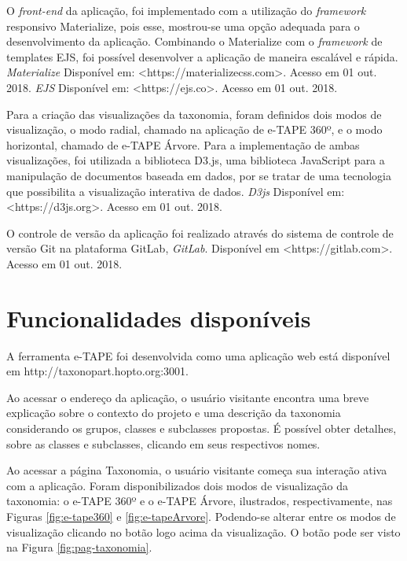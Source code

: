 \par
O \textit{front-end} da aplicação, foi implementado com a utilização do \textit{framework} responsivo Materialize, pois esse, 
mostrou-se uma opção adequada para o desenvolvimento da aplicação. Combinando o Materialize com o \textit{framework} de templates EJS, 
foi possível desenvolver a aplicação de maneira escalável e rápida. \textit{Materialize} Disponível em: <https://materializecss.com>. Acesso em 01 out. 2018.
\textit{EJS} Disponível em: <https://ejs.co>. Acesso em 01 out. 2018.

\par
Para a criação das visualizações da taxonomia, foram definidos dois modos de visualização, o modo radial, chamado na aplicação de e-TAPE 360º, e o modo horizontal, 
chamado de e-TAPE Árvore. Para a implementação de ambas visualizações, foi utilizada a biblioteca D3.js, uma biblioteca JavaScript para a manipulação de documentos 
baseada em dados, por se tratar de uma tecnologia que possibilita a visualização interativa de dados.
\textit{D3js} Disponível em: <https://d3js.org>. Acesso em 01 out. 2018.

\par
O controle de versão da aplicação foi realizado através do sistema de controle de versão Git na plataforma GitLab, \textit{GitLab}. 
Disponível em <https://gitlab.com>. Acesso em 01 out. 2018.

\section{Funcionalidades disponíveis}
\label{sec:funcionamento}
A ferramenta e-TAPE foi desenvolvida como uma aplicação web está disponível em http://taxonopart.hopto.org:3001.

\par
Ao acessar o endereço da aplicação, o usuário visitante encontra uma breve explicação sobre o contexto do projeto e uma descrição da taxonomia considerando os grupos,
classes e subclasses propostas. É possível obter detalhes, sobre as classes e subclasses, clicando em seus respectivos nomes. 

\par
Ao acessar a página Taxonomia, o usuário visitante começa sua interação ativa com a aplicação.
Foram disponibilizados dois modos de visualização da taxonomia: o e-TAPE 360º e o e-TAPE Árvore, ilustrados, respectivamente,
nas Figuras \ref{fig:e-tape360} e \ref{fig:e-tapeArvore}. Podendo-se alterar entre os modos de visualização clicando no botão logo acima da visualização.
O botão pode ser visto na Figura \ref{fig:pag-taxonomia}.

